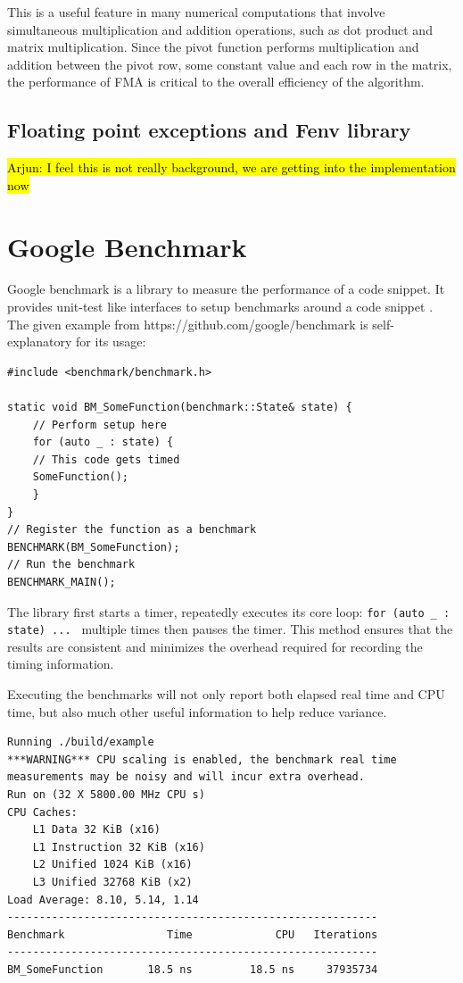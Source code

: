 \documentclass[logo,bsc,singlespacing,parskip]{infthesis}
\begin{document}
This is a useful feature in many numerical computations that involve
simultaneous multiplication and addition operations, such as dot product and
matrix multiplication. Since the pivot function performs multiplication and
addition between the pivot row, some constant value and each row in the matrix,
the performance of FMA is critical to the overall efficiency of the algorithm. 

\subsection{Floating point exceptions and Fenv library}
\label{sec:fpe}
\hl{Arjun: I feel this is not really background, we are getting into the implementation now}

\section{Google Benchmark}
Google benchmark is a library to measure the performance of a code snippet. It
provides unit-test like interfaces to setup benchmarks around a code snippet
\cite{googlebench}. The given example from https://github.com/google/benchmark
is self-explanatory for its usage: 

\begin{verbatim}
#include <benchmark/benchmark.h>

static void BM_SomeFunction(benchmark::State& state) {
    // Perform setup here
    for (auto _ : state) {
    // This code gets timed
    SomeFunction();
    }
}
// Register the function as a benchmark
BENCHMARK(BM_SomeFunction);
// Run the benchmark
BENCHMARK_MAIN();
\end{verbatim}

The library first starts a timer, repeatedly executes its core loop: \texttt{for
(auto \_ : state) ... } multiple times then pauses the timer. This method
ensures that the results are consistent and minimizes the overhead required for
recording the timing information. 

Executing the benchmarks will not only report both elapsed real time and CPU
time, but also much other useful information to help reduce variance. 
\begin{verbatim}
Running ./build/example
***WARNING*** CPU scaling is enabled, the benchmark real time 
measurements may be noisy and will incur extra overhead.
Run on (32 X 5800.00 MHz CPU s)
CPU Caches:
    L1 Data 32 KiB (x16)
    L1 Instruction 32 KiB (x16)
    L2 Unified 1024 KiB (x16)
    L3 Unified 32768 KiB (x2)
Load Average: 8.10, 5.14, 1.14
----------------------------------------------------------
Benchmark                Time             CPU   Iterations
----------------------------------------------------------
BM_SomeFunction       18.5 ns         18.5 ns     37935734
\end{verbatim}
\end{document}

